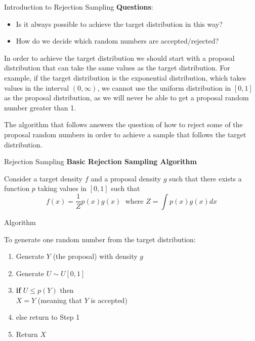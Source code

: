 \documentclass[8pt]{beamer}
\begin{document}
\begin{frame}{Introduction to Rejection Sampling}
\textbf{Questions}: 

\begin{itemize}
\item Is it always possible to achieve the target distribution in this way?
\item How do we decide which random numbers are accepted/rejected?
\end{itemize}

In order to achieve the target distribution we should start with a proposal distribution that can take the same values as the target distribution.
For example, if the target distribution is the exponential distribution, which takes values in the interval $(0,\infty)$, we cannot use the uniform distribution in $[0,1]$
as the proposal distribution, as we will never be able to get a proposal random number greater than 1.

\vspace{2mm}

The algorithm that follows answers the question of how to reject some of the proposal random numbers in order to achieve a sample that follows the target distribution. 
\end{frame}


\begin{frame}{Rejection Sampling}
\textbf{Basic Rejection Sampling Algorithm}

Consider a target density $f$ and a proposal density $g$ such that there exists a function $p$ taking values in $[0,1]$ such that 
\begin{equation*}
f(x)=\frac{1}{Z}p(x)g(x)  \; \text{ where } Z=\int p(x) g(x) dx
\end{equation*}

\alert{Algorithm}

To generate one random number from the target distribution:

\begin{enumerate}
	\item Generate $Y$ (the proposal) with density $g$ 
	\item Generate $U \sim U[0,1]$
	\item {\bf if} $U \leq p(Y)$ then \\
       $X=Y$ (meaning that $Y$ is accepted)\\  
	\item else return to Step 1
	\item Return $X$
\end{enumerate}
\end{frame}
\end{document}
